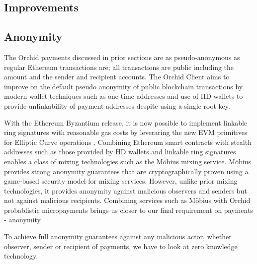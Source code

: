 

\subsection{Improvements}

\subsection{Anonymity}
\label{sec:anon}

The Orchid payments discussed in prior sections are as pseudo-anonymous as regular Ethereum transactions are; all transactions are public including the amount and the sender and recipient accounts. The Orchid Client aims to improve on the default pseudo anonymity of public blockchain transactions by modern wallet techniques such as one-time addresses \cite{AddressReuse} and use of HD wallets \cite{HDWallets} to provide unlinkability of payment addresses despite using a single root key.

With the Ethereum Byzantium release, it is now possible to implement linkable ring signatures with reasonable gas costs by leveraring the new EVM primitives for Elliptic Curve operations \cite{ETHRingSigs}. Combining Ethereum smart contracts with stealth addresses such as those provided by HD wallets and linkable ring signatures enables a class of mixing technologies such as the Möbius\cite{Moebius} mixing service. Möbius provides strong anonymity guarantees that are cryptographically proven using a game-based security model for mixing services. However, unlike prior mixing technologies, it provides anonymity against malicious observers and senders but not against malicious recipients. Combining services such as Möbius with Orchid probablistic micropayments brings us closer to our final requirement on payments - anonymity.

To achieve full anonymity guarantees against any malicious actor, whether observer, sender or recipient of payments, we have to look at zero knowledge technology.


